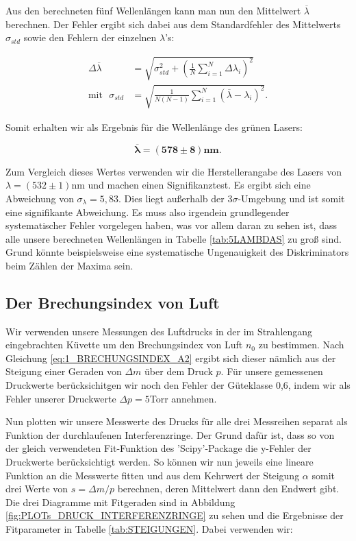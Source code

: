 \documentclass{article}
\begin{document}
\phantom{.}

Aus den berechneten fünf Wellenlängen kann man nun den Mittelwert $\overline{\lambda}$ berechnen. Der Fehler ergibt sich dabei aus dem Standardfehler des Mittelwerts $\sigma_{std}$ sowie den Fehlern der einzelnen $\lambda$'s:

\begin{equation}
    \begin{split}
        \Delta \overline{\lambda} &= \sqrt{\sigma_{std}^2 + \left( \frac{1}{N} \sum_{i=1}^N \Delta \lambda_i \right)^2} \\
        \text{mit} \ \ \ \sigma_{std} &= \sqrt{\frac{1}{N(N-1)} \sum_{i=1}^N (\overline{\lambda} - \lambda_i)^2}.
    \end{split}
    \label{eq:FEHLER_MW}
\end{equation}

Somit erhalten wir als Ergebnis für die Wellenlänge des grünen Lasers:

\begin{equation}
    \bm{\overline{\lambda} = (578 \pm 8)} \textbf{nm}.
\end{equation}

Zum Vergleich dieses Wertes verwenden wir die Herstellerangabe des Lasers von $\lambda = (532 \pm 1)$nm und machen einen Signifikanztest. Es ergibt sich eine Abweichung von $\sigma_\lambda = 5,83$. Dies liegt außerhalb der $3\sigma$-Umgebung und ist somit eine signifikante Abweichung. Es muss also irgendein grundlegender systematischer Fehler vorgelegen haben, was vor allem daran zu sehen ist, dass alle unsere berechneten Wellenlängen in Tabelle \ref{tab:5LAMBDAS} zu groß sind. Grund könnte beispielsweise eine systematische Ungenauigkeit des Diskriminators beim Zählen der Maxima sein.


\newpage
\subsection{Der Brechungsindex von Luft}

Wir verwenden unsere Messungen des Luftdrucks in der im Strahlengang eingebrachten Küvette um den Brechungsindex von Luft $n_0$ zu bestimmen. Nach Gleichung \ref{eq:1_BRECHUNGSINDEX_A2} ergibt sich dieser nämlich aus der Steigung einer Geraden von $\Delta m$ über dem Druck $p$. Für unsere gemessenen Druckwerte berücksichitgen wir noch den Fehler der Güteklasse 0,6, indem wir als Fehler unserer Druckwerte $\Delta p = 5$Torr annehmen.

Nun plotten wir unsere Messwerte des Drucks für alle drei Messreihen separat als Funktion der durchlaufenen Interferenzringe. Der Grund dafür ist, dass so von der gleich verwendeten Fit-Funktion des 'Scipy'-Package die y-Fehler der Druckwerte berücksichtigt werden. So können wir nun jeweils eine lineare Funktion an die Messwerte fitten und aus dem Kehrwert der Steigung $\alpha$ somit drei Werte von $s = \Delta m / p$ berechnen, deren Mittelwert dann den Endwert gibt. Die drei Diagramme mit Fitgeraden sind in Abbildung \ref{fig:PLOTs_DRUCK_INTERFERENZRINGE} zu sehen und die Ergebnisse der Fitparameter in Tabelle \ref{tab:STEIGUNGEN}. Dabei verwenden wir:
\end{document}
